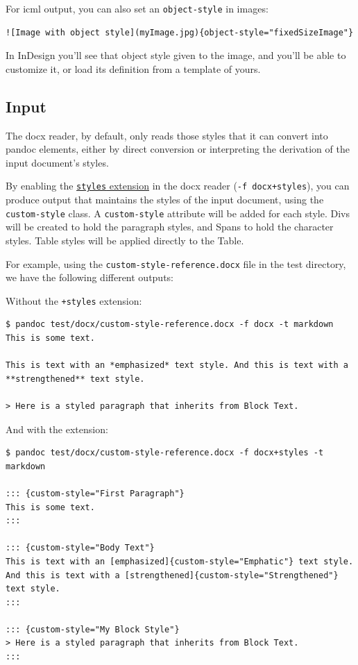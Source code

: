 \documentclass[
]{article}
\begin{document}
For icml output, you can also set an \texttt{object-style} in images:

\begin{verbatim}
![Image with object style](myImage.jpg){object-style="fixedSizeImage"}
\end{verbatim}

In InDesign you'll see that object style given to the image, and you'll
be able to customize it, or load its definition from a template of
yours.

\hypertarget{input}{%
\subsection{Input}\label{input}}

The docx reader, by default, only reads those styles that it can convert
into pandoc elements, either by direct conversion or interpreting the
derivation of the input document's styles.

By enabling the \protect\hyperlink{ext-styles}{\texttt{styles}
extension} in the docx reader (\texttt{-f\ docx+styles}), you can
produce output that maintains the styles of the input document, using
the \texttt{custom-style} class. A \texttt{custom-style} attribute will
be added for each style. Divs will be created to hold the paragraph
styles, and Spans to hold the character styles. Table styles will be
applied directly to the Table.

For example, using the \texttt{custom-style-reference.docx} file in the
test directory, we have the following different outputs:

Without the \texttt{+styles} extension:

\begin{verbatim}
$ pandoc test/docx/custom-style-reference.docx -f docx -t markdown
This is some text.

This is text with an *emphasized* text style. And this is text with a
**strengthened** text style.

> Here is a styled paragraph that inherits from Block Text.
\end{verbatim}

And with the extension:

\begin{verbatim}
$ pandoc test/docx/custom-style-reference.docx -f docx+styles -t markdown

::: {custom-style="First Paragraph"}
This is some text.
:::

::: {custom-style="Body Text"}
This is text with an [emphasized]{custom-style="Emphatic"} text style.
And this is text with a [strengthened]{custom-style="Strengthened"}
text style.
:::

::: {custom-style="My Block Style"}
> Here is a styled paragraph that inherits from Block Text.
:::
\end{verbatim}
\end{document}
